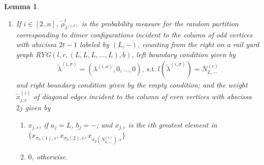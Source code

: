 \documentclass[11pt]{amsart}
\theoremstyle{plain}
\newtheorem{lemma}[theorem]{Lemma}
\theoremstyle{definition}
\theoremstyle{remark}
\newcommand\si{\sigma}
\numberwithin{equation}{section}
\numberwithin{theorem}{section}
\numberwithin{figure}{section}
\begin{document}
\begin{lemma}
\begin{enumerate}
\begin{enumerate}
\item $x_{j,\epsilon}$, if one of the following two conditions holds
\begin{enumerate}
\item $(a_j,b_j)=(L,-)$, and $x_{j,\epsilon}=x_{\si_0(1),\epsilon}$; or
\item $(a_j,b_j)\neq(L,-)$
\end{enumerate}
\item $0$, otherwise.
\end{enumerate}
\item If $i\in[2..n]$,
$\tilde{\rho}^{t}_{\lambda^{(i,\si)}}$  
is the probability measure for the random partition  corresponding to dimer configurations incident to the  column of odd vertices with abscissa $2t-1$ labeled by $(L,-)$, counting from the right on a rail yard graph RYG$(l,r,(L,L,L,\ldots,L),\underline{b})$, left boundary condition given by 
\begin{align*}
\tilde{\lambda}^{(i,\si)}=(\lambda^{(i,\si)},0,\ldots,0),\ \mathrm{s.t.}\ l(\tilde{\lambda}^{(i,\si)})=N_{L,-}^{(\epsilon
)}
\end{align*}
and right boundary condition given by the empty condition; and the weight $\tilde{x}_{j,\epsilon}^{(i)}$ of diagonal edges incident to the column of even vertices with abscissa $2j$ given by
\begin{enumerate}
\item $x_{j,\epsilon}$, if $a_j=L$, $b_j=-$; and $x_{j,\epsilon}$ is the $i$th greatest element in $\{x_{\si_0(1),\epsilon},x_{\si_0(2),\epsilon},x_{\si_0(N_{L,-}^{(\epsilon)}),\epsilon}\}$
\item $0$, otherwise.
\end{enumerate}
\end{enumerate}
\end{lemma}
\end{document}
